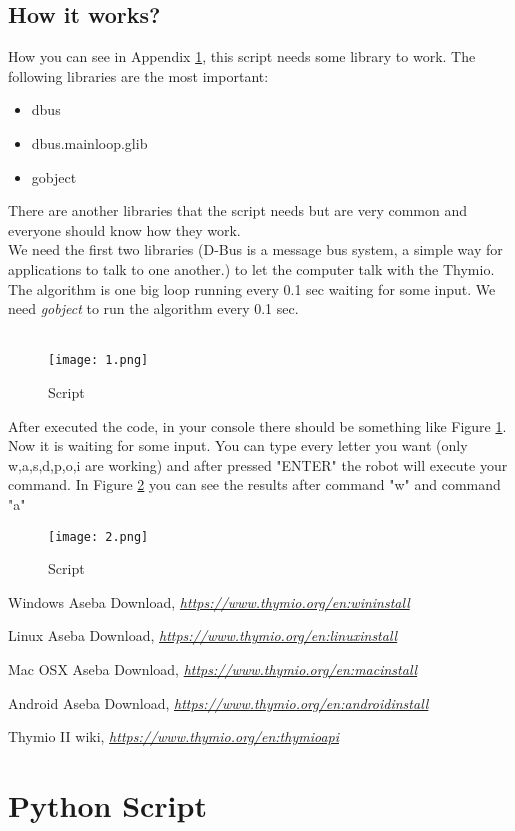 \documentclass[12pt]{article}%
\begin{document}
	\subsection{How it works?}
		How you can see in Appendix \ref{script}, this script needs some library to work. The following libraries are the most important:
		\begin{itemize}
			\item dbus
			\item dbus.mainloop.glib
			\item gobject
		\end{itemize}
		There are another libraries that the script needs but are very common and everyone should know how they work. \\
		We need the first two libraries (D-Bus is a message bus system, a simple way for applications to talk to one another.) to let the computer talk with the Thymio. The algorithm is one big loop running every 0.1 sec waiting for some input. We need \textit{gobject} to run the algorithm every 0.1 sec. \\\\
		
		\newpage
		\begin{figure}[h]
			\centering
			\texttt{[image: 1.png]}
			\caption{Script}
			\label{script1}
		\end{figure}
		
		After executed the code, in your console there should be something like Figure  \ref{script1}. Now it is waiting for some input. You can type every letter you want (only w,a,s,d,p,o,i are working) and after pressed "ENTER" the robot will execute your command. In Figure \ref{script2} you can see the results after command "w" and command "a"
		
		\begin{figure}[h]
			\centering
			\texttt{[image: 2.png]}
			\caption{Script}
			\label{script2}
		\end{figure}
		 
  
\begin{thebibliography}{9}

	Windows Aseba Download,
	\emph{\url{https://www.thymio.org/en:wininstall}}
	
	Linux Aseba Download,
	\emph{\url{https://www.thymio.org/en:linuxinstall}}
	
	Mac OSX Aseba Download,
	\emph{\url{https://www.thymio.org/en:macinstall}}
	
	Android Aseba Download,
	\emph{\url{https://www.thymio.org/en:androidinstall}}
	
	Thymio II wiki,
	\emph{\url{https://www.thymio.org/en:thymioapi}}
\newpage
\end{thebibliography}

\appendix

	\section{Python Script}\label{script}
	
	
\end{document}
